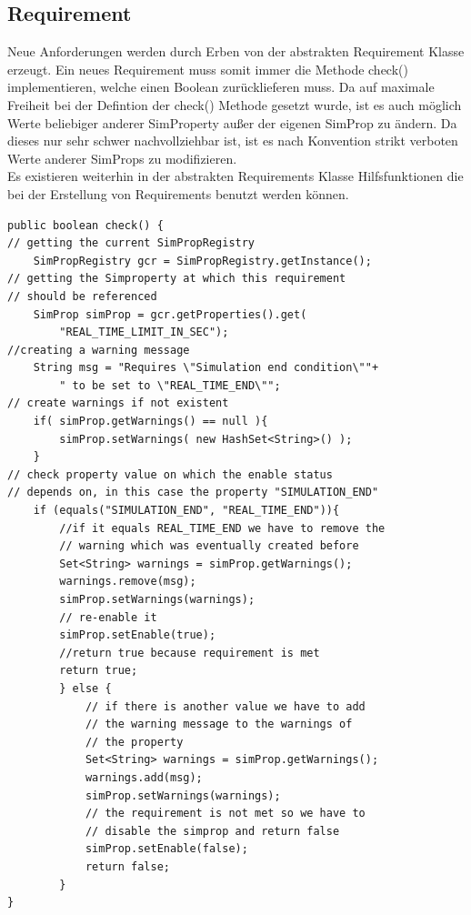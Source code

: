 \documentclass[a4paper, 11pt]{article} %
\begin{document}
\subsection{Requirement}
\label{ssub:Requirements}
Neue Anforderungen werden durch Erben von der abstrakten Requirement Klasse erzeugt. Ein neues Requirement muss somit immer die Methode check() implementieren, welche einen Boolean zurücklieferen muss. Da auf maximale Freiheit bei der Defintion der check() Methode gesetzt wurde, ist es auch möglich Werte beliebiger anderer SimProperty außer der eigenen SimProp zu ändern. Da dieses nur sehr schwer nachvollziehbar ist, ist es nach Konvention strikt verboten Werte anderer SimProps zu modifizieren.\\

Es existieren weiterhin in der abstrakten Requirements Klasse Hilfsfunktionen die bei der Erstellung von Requirements benutzt werden können.


\begin{lstlisting}[caption={Beispiel: check() Methode einer Enable Anforderung}]
public boolean check() {
// getting the current SimPropRegistry
	SimPropRegistry gcr = SimPropRegistry.getInstance();
// getting the Simproperty at which this requirement 
// should be referenced
	SimProp simProp = gcr.getProperties().get(
		"REAL_TIME_LIMIT_IN_SEC");
//creating a warning message
	String msg = "Requires \"Simulation end condition\""+
	 	" to be set to \"REAL_TIME_END\"";
// create warnings if not existent
	if( simProp.getWarnings() == null ){
		simProp.setWarnings( new HashSet<String>() );
	}
// check property value on which the enable status 
// depends on, in this case the property "SIMULATION_END"
	if (equals("SIMULATION_END", "REAL_TIME_END")){
		//if it equals REAL_TIME_END we have to remove the 
		// warning which was eventually created before
		Set<String> warnings = simProp.getWarnings();
		warnings.remove(msg);
		simProp.setWarnings(warnings);
		// re-enable it
		simProp.setEnable(true);
		//return true because requirement is met
		return true;
		} else {
			// if there is another value we have to add 
			// the warning message to the warnings of 
			// the property
			Set<String> warnings = simProp.getWarnings();
			warnings.add(msg);
			simProp.setWarnings(warnings);
			// the requirement is not met so we have to 
			// disable the simprop and return false
			simProp.setEnable(false);
			return false;
		}
}
\end{lstlisting}
\end{document}
